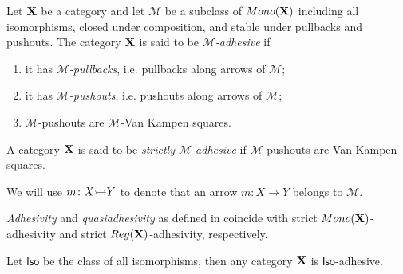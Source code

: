 \documentclass[a4paper,UKenglish,cleveref,pdftex, thm-restate,numberwithinsect]{lipics}
\newcommand{\mon}{\mathsf{Mono}}
\newcommand{\reg}{\mathsf{Reg}}
\newcommand{\mto}[0]{\scalebox{1}{$\rightarrowtail$}}
\def\X{\textbf {\textup{X}}}
\newcommand{\rem}[2]{{\color{blue}#1}{\color{red}#2}}
\renewcommand{\rem}[2]{}
\begin{document}
\begin{definition}
  Let $\X$ be a category and let $\mathcal{M}$ be a subclass of
  $\mon(\X)$ 
  including  all isomorphisms, closed under composition,
  and stable under pullbacks and pushouts.
  The category
  $\X$ is said to be \emph{$\mathcal{M}$-adhesive} if
  \begin{enumerate}
  \item it has \emph{$\mathcal{M}$-pullbacks}, i.e. pullbacks along arrows of $\mathcal{M}$;
  \item it has \emph{$\mathcal{M}$-pushouts}, i.e. pushouts along arrows of $\mathcal{M}$;
  \item  $\mathcal{M}$-pushouts are $\mathcal{M}$-Van Kampen squares.
  \end{enumerate}
  
  A category $\X$ is said to be \emph{strictly $\mathcal{M}$-adhesive}
  if $\mathcal{M}$-pushouts are Van Kampen squares.
\end{definition}
We will use $m\colon X\mto Y$ to denote that an arrow $m\colon X\to Y$ belongs to $\mathcal{M}$.

\rem{rimuoverei}{
\begin{remark}
  \label{rem:diff}
  Our notion of $\mathcal{M}$-adhesivity follows
  \cite{ehrig2012,ehrig2014adhesive} and is different from the one of
  \cite{azzi2019essence}. What is called $\mathcal{M}$-adhesivity in
  that paper corresponds to our strict
  $\mathcal{M}$-adhesivity. Moreover, in \cite{azzi2019essence} the
  class $\mathcal{M}$ is assumed to be only stable under
  pullbacks. However, if $\mathcal{M}$ contains all split monos, then
  stability under pushouts can be deduced from the other
  axioms~\cite[Prop.~$5.1.21$]{castelnovo2023thesis}.
\end{remark}
}

\begin{remark}
  \label{rem:salva}
  \emph{Adhesivity} and \emph{quasiadhesivity} as defined in \cite{lack2005adhesive,garner2012axioms}  coincide with  strict $\mon(\X) $-adhesivity and strict $\reg(\X)$-adhesivity, respectively. 
\end{remark}

\begin{example}\label{rem:iso} Let $\mathsf{Iso}$ be the class of all isomorphisms, then any category $\X$ is $\mathsf{Iso}$-adhesive.
\end{example}
\end{document}
